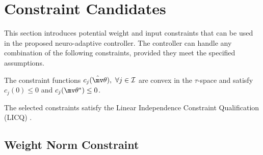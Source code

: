 \documentclass[lettersize,journal]{IEEEtran}
\newcommand*{\wth}{\mv\theta}
\begin{document}
 \section{Constraint Candidates}\label{sec:cstr candidates} 

This section introduces potential weight and input constraints that can be used in the proposed neuro-adaptive controller. 
The controller can handle any combination of the following constraints, provided they meet the specified assumptions.

\begin{assum}
    The constraint functions $c_j(\hat\wth),\ \forall j\in\mathcal I$ are convex in the $\tau$-space and satisfy $c_j(0) \le 0$ and $c_j(\wth^*)\le 0$.
    \label{assum1}
\end{assum}



\begin{assum}
    The selected constraints satisfy the Linear Independence Constraint Qualification (LICQ) \cite[Chap.~12 Def.~12.1]{RN22}.
    \label{assum2}
\end{assum}

\subsection{Weight Norm Constraint}\label{sec:cstr weight ball}
\end{document}
